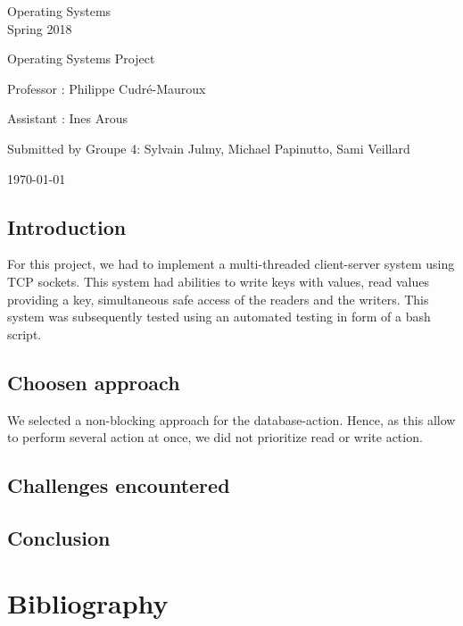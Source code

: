 \documentclass[a4paper,11pt]{report}
\begin{document}
\begin{center}
  \Large{
    Operating Systems\\
    Spring 2018
  }
  
  \noindent\makebox[\linewidth]{\rule{\linewidth}{0.4pt}}
  Operating Systems Project
  \noindent\makebox[\linewidth]{\rule{\linewidth}{0.4pt}}

  \begin{flushleft}
    Professor : Philippe Cudré-Mauroux

    Assistant : Ines Arous
  \end{flushleft}
  
  \noindent\makebox[\linewidth]{\rule{\linewidth}{0.4pt}}

  Submitted by Groupe 4: Sylvain Julmy, Michael Papinutto, Sami Veillard
  
  \noindent\makebox[\linewidth]{\rule{\textwidth}{1pt}}
  \vspace*{0.8cm}
  \today

\end{center}

\newpage

\section*{Introduction}
For this project, we had to implement a multi-threaded client-server system using TCP sockets.
This system had abilities to write keys with values, read values providing a key, simultaneous safe access of the readers and the writers.
This system was subsequently tested using an automated testing in form of a bash script.

\section*{Choosen approach}
We selected a non-blocking approach for the database-action.
Hence, as this allow to perform several action at once, we did not prioritize read or write action.
\section*{Challenges encountered}

\section*{Conclusion}

\chapter*{Bibliography}
\end{document}
